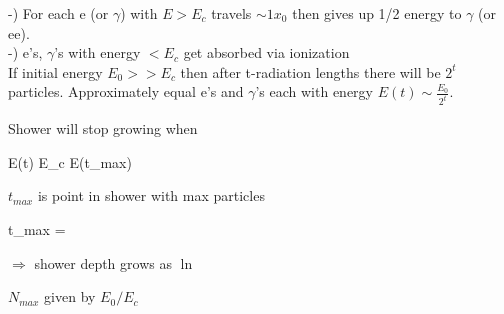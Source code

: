 {\begin{minipage}{0.5\textwidth}
-) For each e (or $\gamma$) with $E > E_c$ travels $\sim 1 x_0$ then gives up 1/2 energy to $\gamma$ (or ee).\\

-) e's, $\gamma$'s with energy $< E_c$ get absorbed via ionization\\

If initial energy $E_0 >> E_c$ then after t-radiation lengths there will be $2^t$ particles. 
Approximately equal e's and $\gamma$'s each with energy $E(t) \sim \frac{E_0 }{2^t}$.

\end{minipage} 

Shower will stop growing when 

\be
E(t) \simeq E_c \equiv E(t_{max})
\ee

$t_{max}$ is point in shower with max particles


\be
t_{max} = 
\ee

$\Rightarrow$ shower depth grows as $\ln$

$N_{max}$ given by $E_0/E_c$

}



